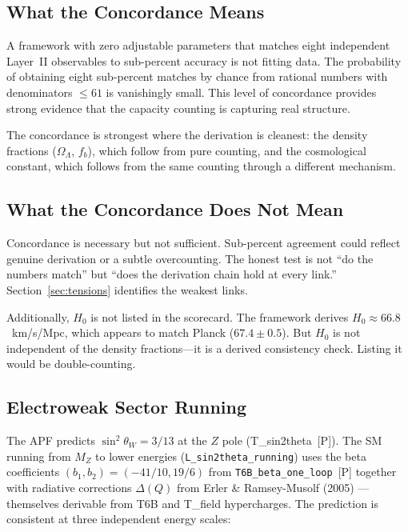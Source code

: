 \documentclass[11pt]{article}
\begin{document}
\subsection{What the Concordance Means}

A framework with zero adjustable parameters that matches eight independent Layer~II observables to sub-percent accuracy is not fitting data.  The probability of obtaining eight sub-percent matches by chance from rational numbers with denominators $\le 61$ is vanishingly small.  This level of concordance provides strong evidence that the capacity counting is capturing real structure.

The concordance is strongest where the derivation is cleanest: the density fractions ($\Omega_\Lambda$, $f_b$), which follow from pure counting, and the cosmological constant, which follows from the same counting through a different mechanism.


\subsection{What the Concordance Does Not Mean}

Concordance is necessary but not sufficient.  Sub-percent agreement could reflect genuine derivation or a subtle overcounting.  The honest test is not ``do the numbers match'' but ``does the derivation chain hold at every link.''  Section~\ref{sec:tensions} identifies the weakest links.

Additionally, $H_0$ is not listed in the scorecard.  The framework derives $H_0 \approx 66.8$~km/s/Mpc, which appears to match Planck ($67.4 \pm 0.5$).  But $H_0$ is not independent of the density fractions---it is a derived consistency check.  Listing it would be double-counting.


\subsection{Electroweak Sector Running}

The APF predicts $\sin^2\!\theta_W = 3/13$ at the $Z$ pole (T\_sin2theta~[P]).  The SM running from $M_Z$ to lower energies (\texttt{L\_sin2theta\_running}) uses the beta coefficients $(b_1, b_2) = (-41/10, 19/6)$ from \texttt{T6B\_beta\_one\_loop}~[P] together with radiative corrections $\Delta(Q)$ from Erler \& Ramsey-Musolf (2005) --- themselves derivable from T6B and T\_field hypercharges.  The prediction is consistent at three independent energy scales:
\end{document}
